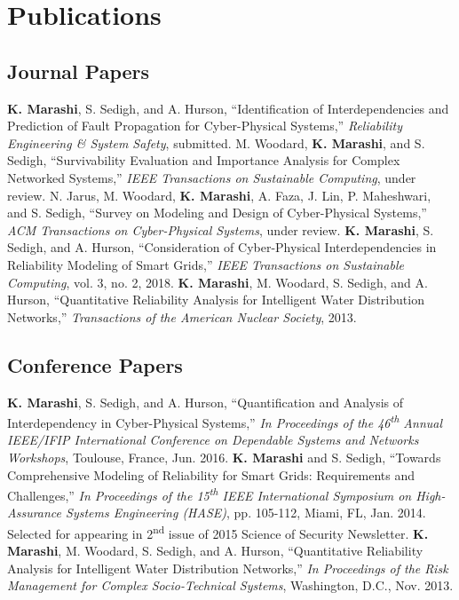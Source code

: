 \section{Publications}
\subsection{Journal Papers}
\begin{cvpubs}
  \cvpub
    {\textbf{K. Marashi}, S. Sedigh, and A. Hurson, ``Identification of Interdependencies and Prediction of Fault Propagation for Cyber-Physical Systems,'' \textit{Reliability Engineering \& System Safety}, submitted.}
  \cvpub
    {M. Woodard, \textbf{K. Marashi}, and S. Sedigh, ``Survivability Evaluation and Importance Analysis for Complex Networked Systems,'' \textit{IEEE Transactions on Sustainable Computing}, under review.}
  \cvpub
    {N. Jarus, M. Woodard, \textbf{K. Marashi}, A. Faza, J. Lin, P. Maheshwari, and S. Sedigh, ``Survey on Modeling and Design of Cyber-Physical Systems,'' \textit{ACM Transactions on Cyber-Physical Systems}, under review.}
  \cvpub
    {\textbf{K. Marashi}, S. Sedigh, and A. Hurson, ``Consideration of Cyber-Physical Interdependencies in Reliability Modeling of Smart Grids,'' \textit{IEEE Transactions on Sustainable Computing}, vol. 3, no. 2, 2018.}
  \cvpub
    {\textbf{K. Marashi}, M. Woodard, S. Sedigh, and A. Hurson, ``Quantitative Reliability Analysis for Intelligent Water Distribution Networks,'' \textit{Transactions of the American Nuclear Society}, 2013.}
\end{cvpubs}

\subsection{Conference Papers}
\begin{cvpubs}
  \cvpub
    {\textbf{K. Marashi}, S. Sedigh, and A. Hurson, ``Quantification and Analysis of Interdependency in Cyber-Physical Systems,'' \textit{In Proceedings of the 46\textsuperscript{th} Annual IEEE/IFIP International Conference on Dependable Systems and Networks Workshops}, Toulouse, France, Jun. 2016.}
  \cvpub
    {\textbf{K. Marashi} and S. Sedigh, ``Towards Comprehensive Modeling of Reliability for Smart Grids: Requirements and Challenges,'' \textit{In Proceedings of the 15\textsuperscript{th} IEEE International Symposium on High-Assurance Systems Engineering (HASE)}, pp. 105-112, Miami, FL, Jan. 2014. Selected for appearing in 2\textsuperscript{nd} issue of 2015 Science of Security Newsletter.}
  \cvpub
    {\textbf{K. Marashi}, M. Woodard, S. Sedigh, and A. Hurson, ``Quantitative Reliability Analysis for Intelligent Water Distribution Networks,'' \textit{In Proceedings of the Risk Management for Complex Socio-Technical Systems}, Washington, D.C., Nov. 2013.}
\end{cvpubs}
